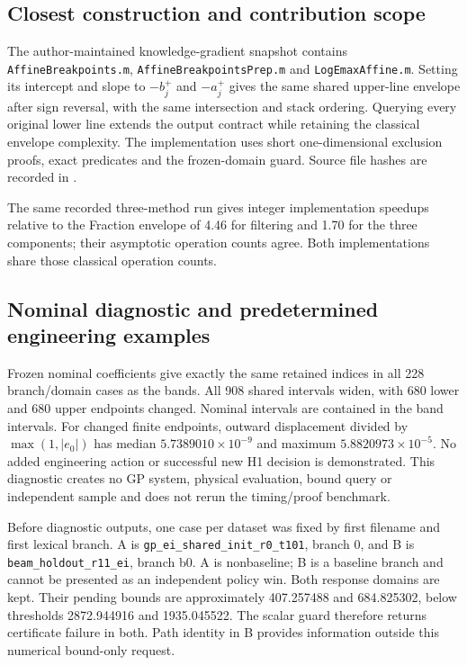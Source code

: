 \subsection{Closest construction and contribution scope}

The author-maintained knowledge-gradient snapshot \citep{ref42} contains \texttt{AffineBreakpoints.m}, \texttt{AffineBreakpointsPrep.m} and \texttt{LogEmaxAffine.m}. Setting its intercept and slope to $-b_j^+$ and $-a_j^+$ gives the same shared upper-line envelope after sign reversal, with the same intersection and stack ordering. Querying every original lower line extends the output contract while retaining the classical envelope complexity. The implementation uses short one-dimensional exclusion proofs, exact predicates and the frozen-domain guard. Source file hashes are recorded in .

The same recorded three-method run gives integer implementation speedups relative to the Fraction envelope of 4.46 for filtering and 1.70 for the three components; their asymptotic operation counts agree. Both implementations share those classical operation counts.

\subsection{Nominal diagnostic and predetermined engineering examples}

Frozen nominal coefficients give exactly the same retained indices in all 228 branch/domain cases as the bands. All 908 shared intervals widen, with 680 lower and 680 upper endpoints changed. Nominal intervals are contained in the band intervals. For changed finite endpoints, outward displacement divided by $\max(1,|e_0|)$ has median $5.7389010\times10^{-9}$ and maximum $5.8820973\times10^{-5}$. No added engineering action or successful new H1 decision is demonstrated. This diagnostic creates no GP system, physical evaluation, bound query or independent sample and does not rerun the timing/proof benchmark.

Before diagnostic outputs, one case per dataset was fixed by first filename and first lexical branch. A is \texttt{gp\_ei\_shared\_init\_r0\_t101}, branch 0, and B is \texttt{beam\_holdout\_r11\_ei}, branch b0. A is nonbaseline; B is a baseline branch and cannot be presented as an independent policy win. Both response domains are kept. Their pending bounds are approximately 407.257488 and 684.825302, below thresholds 2872.944916 and 1935.045522. The scalar guard therefore returns certificate failure in both. Path identity in B provides information outside this numerical bound-only request.

